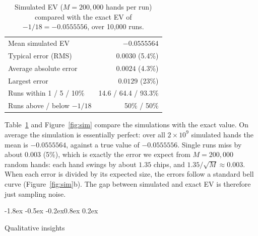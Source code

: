 \documentclass{article}
\makeatletter
\renewcommand{\subsection}{\@startsection{subsection}{2}{\z@}%
    {-1.8ex \@plus -0.5ex \@minus -0.2ex}{0.8ex \@plus 0.2ex}%
    {\normalsize\bf\raggedright}}
\makeatother
\begin{document}
\begin{table}[htb]
\centering
\small
\caption{Simulated EV ($M = 200{,}000$ hands per run) compared with the exact
EV of $-1/18 = -0.0555556$, over 10{,}000 runs.}
\label{tab:dev}
\setlength{\tabcolsep}{4pt}
\begin{tabular}{lr}
\toprule
Mean simulated EV & $-0.0555564$ \\
Typical error (RMS) & $0.0030$ (5.4\%) \\
Average absolute error & $0.0024$ (4.3\%) \\
Largest error & $0.0129$ (23\%) \\
Runs within 1 / 5 / 10\% & 14.6 / 64.4 / 93.3\% \\
Runs above / below $-1/18$ & 50\% / 50\% \\
\bottomrule
\end{tabular}
\end{table}

Table~\ref{tab:dev} and Figure~\ref{fig:sim} compare the simulations with the
exact value. On average the simulation is essentially perfect: over all
$2\times10^9$ simulated hands the mean is $-0.0555564$, against a true value
of $-0.0555556$. Single runs miss by about $0.003$ (5\%), which is exactly the
error we expect from $M = 200{,}000$ random hands: each hand swings by about
$1.35$ chips, and $1.35/\sqrt{M} \approx 0.003$. When each error is divided by
its expected size, the errors follow a standard bell curve
(Figure~\ref{fig:sim}b). The gap between simulated and exact EV is therefore
just sampling noise.

\subsection{Qualitative insights}
\label{sec:qual}
\end{document}
